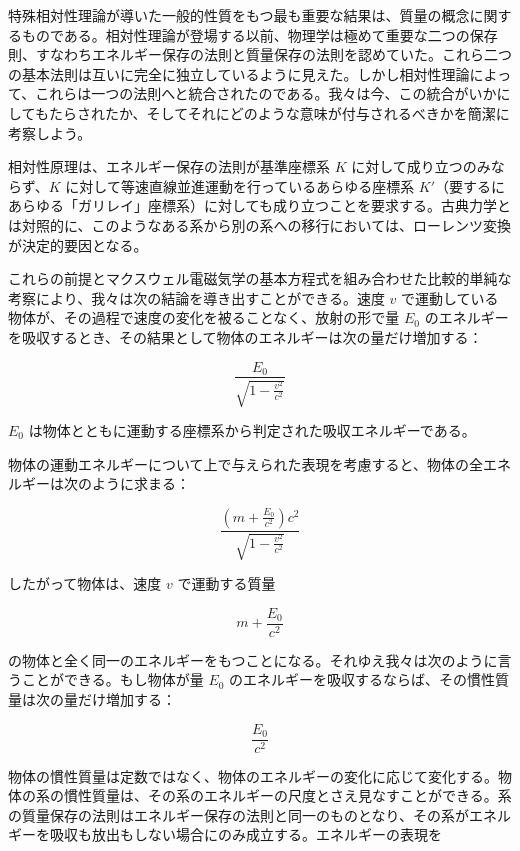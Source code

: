\documentclass[a4paper,11pt,openany]{ltjsbook}
\begin{document}
特殊相対性理論が導いた一般的性質をもつ最も重要な結果は、質量の概念に関するものである。相対性理論が登場する以前、物理学は極めて重要な二つの保存則、すなわちエネルギー保存の法則と質量保存の法則を認めていた。これら二つの基本法則は互いに完全に独立しているように見えた。しかし相対性理論によって、これらは一つの法則へと統合されたのである。我々は今、この統合がいかにしてもたらされたか、そしてそれにどのような意味が付与されるべきかを簡潔に考察しよう。

相対性原理は、エネルギー保存の法則が基準座標系 $K$ に対して成り立つのみならず、$K$ に対して等速直線並進運動を行っているあらゆる座標系 $K'$（要するにあらゆる「ガリレイ」座標系）に対しても成り立つことを要求する。古典力学とは対照的に、このようなある系から別の系への移行においては、ローレンツ変換が決定的要因となる。

これらの前提とマクスウェル電磁気学の基本方程式を組み合わせた比較的単純な考察により、我々は次の結論を導き出すことができる。速度 $v$ で運動している物体が、その過程で速度の変化を被ることなく、放射の形で量 $E_0$ のエネルギーを吸収するとき、その結果として物体のエネルギーは次の量だけ増加する：



\[ \frac{E_0}{\sqrt{1 - \frac{v^2}{c^2}}} \]



 $E_0$ は物体とともに運動する座標系から判定された吸収エネルギーである。

物体の運動エネルギーについて上で与えられた表現を考慮すると、物体の全エネルギーは次のように求まる：



\[ \frac{(m + \frac{E_0}{c^2}) c^2}{\sqrt{1 - \frac{v^2}{c^2}}} \]



したがって物体は、速度 $v$ で運動する質量



\[ m + \frac{E_0}{c^2} \]



の物体と全く同一のエネルギーをもつことになる。それゆえ我々は次のように言うことができる。もし物体が量 $E_0$ のエネルギーを吸収するならば、その慣性質量は次の量だけ増加する：



\[ \frac{E_0}{c^2} \]



物体の慣性質量は定数ではなく、物体のエネルギーの変化に応じて変化する。物体の系の慣性質量は、その系のエネルギーの尺度とさえ見なすことができる。系の質量保存の法則はエネルギー保存の法則と同一のものとなり、その系がエネルギーを吸収も放出もしない場合にのみ成立する。エネルギーの表現を
\end{document}
